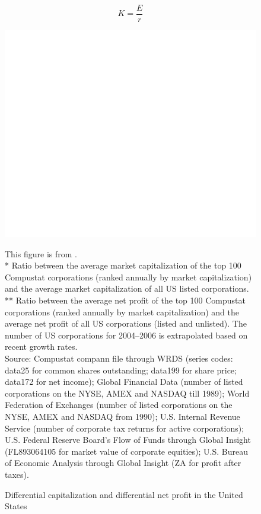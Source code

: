 \documentclass[12pt]{extarticle}
\begin{document}
\begin{equation}
K = \frac{E}{r}
\end{equation}

\begin{figure}
	\centerline{\includegraphics[scale=0.15]{fig_142.png}}
	\caption{Differential capitalization and differential net profit in the United States}
	\label{fig_diff_capital}
	
	\small
	\smallskip
	
	This figure is from \cite{nitzan_capital_2009}. \\
	
	 * Ratio between the average market capitalization of the top 100 Compustat corporations (ranked annually by market capitalization) and the average market capitalization of all US listed corporations. \\
	
	** Ratio between the average net profit of the top 100 Compustat corporations (ranked annually by market capitalization) and the average net profit of all US corporations (listed and unlisted). The number of US corporations for 2004–2006 is extrapolated based on recent growth rates. \\
	
	Source: Compustat compann file through WRDS (series codes: data25 for common shares outstanding; data199 for share price; data172 for net income); Global Financial Data (number of listed corporations on the NYSE, AMEX and NASDAQ till 1989); World Federation of Exchanges (number of listed corporations on the NYSE, AMEX and NASDAQ from 1990); U.S. Internal Revenue Service (number of corporate tax returns for active corporations); U.S. Federal Reserve Board’s Flow of Funds through Global Insight (FL893064105 for market value of corporate equities); U.S. Bureau of Economic Analysis through Global Insight (ZA for profit after taxes).	
	
\end{figure}
\end{document}
